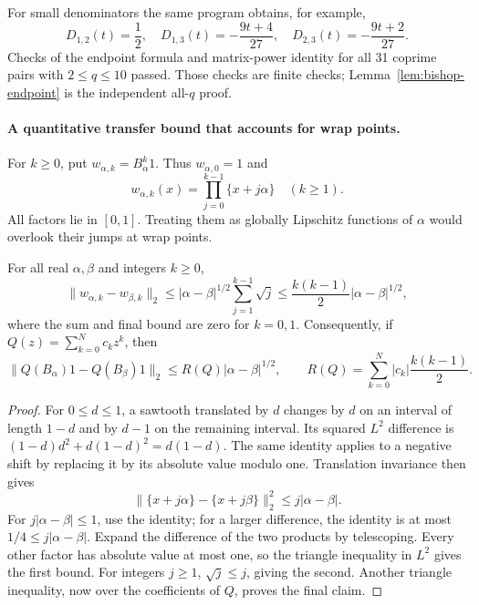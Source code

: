 For small denominators the same program obtains, for example,
\[
 D_{1,2}(t)=\frac12,\quad
 D_{1,3}(t)=-\frac{9t+4}{27},\quad
 D_{2,3}(t)=-\frac{9t+2}{27}.
\]
Checks of the endpoint formula and matrix-power identity for all 31 coprime
pairs with \(2\le q\le10\) passed.  Those checks are finite checks;
Lemma~\ref{lem:bishop-endpoint} is the independent all-\(q\) proof.

\paragraph{A quantitative transfer bound that accounts for wrap points.}
For \(k\ge0\), put \(w_{\alpha,k}=B_\alpha^k1\).  Thus
\(w_{\alpha,0}=1\) and
\[
 w_{\alpha,k}(x)=\prod_{j=0}^{k-1}\{x+j\alpha\}\quad(k\ge1).
\]
All factors lie in \([0,1]\).  Treating them as globally Lipschitz
functions of \(\alpha\) would overlook their jumps at wrap points.

\begin{lemma}\ours{}
\label{lem:bishop-continuity}
For all real \(\alpha,\beta\) and integers \(k\ge0\),
\[
 \|w_{\alpha,k}-w_{\beta,k}\|_2
 \le |\alpha-\beta|^{1/2}\sum_{j=1}^{k-1}\sqrt j
 \le \frac{k(k-1)}2|\alpha-\beta|^{1/2},
\]
where the sum and final bound are zero for \(k=0,1\).
Consequently, if \(Q(z)=\sum_{k=0}^N c_kz^k\), then
\[
 \|Q(B_\alpha)1-Q(B_\beta)1\|_2
 \le R(Q)|\alpha-\beta|^{1/2},\qquad
 R(Q)=\sum_{k=0}^N|c_k|\frac{k(k-1)}2.
\]
\end{lemma}
\begin{proof}
For \(0\le d\le1\), a sawtooth translated by \(d\) changes by
\(d\) on an interval of length \(1-d\) and by \(d-1\) on the remaining
interval.  Its squared \(L^2\) difference is
\((1-d)d^2+d(1-d)^2=d(1-d)\).  The same identity applies to a
negative shift by replacing it by its absolute value modulo one.
Translation invariance then gives
\[
 \|\{x+j\alpha\}-\{x+j\beta\}\|_2^2
 \le j|\alpha-\beta|.
\]
For \(j|\alpha-\beta|\le1\), use the identity; for a larger difference,
the identity is at most \(1/4\le j|\alpha-\beta|\).
Expand the difference of the two products by telescoping.  Every other
factor has absolute value at most one, so the triangle inequality in
\(L^2\) gives the first bound.  For integers \(j\ge1\),
\(\sqrt j\le j\), giving the second.  Another triangle inequality,
now over the coefficients of \(Q\), proves the final claim.
\end{proof}

